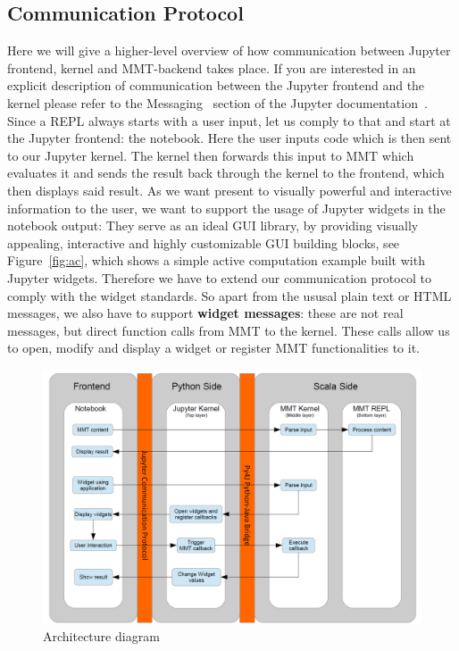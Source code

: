 \subsection{Communication Protocol}
Here we will give a higher-level overview of how communication between Jupyter frontend, kernel and MMT-backend takes place.
If you are interested in an explicit description of communication between the Jupyter frontend and the kernel please refer to the Messaging~\cite{Jupyter messaging} section of the Jupyter documentation~\cite{Jupyter documentation}.
Since a REPL always starts with a user input, let us comply to that and start at the Jupyter frontend: the notebook.
Here the user inputs code which is then sent to our Jupyter kernel.
The kernel then forwards this input to MMT which evaluates it and sends the result back through the kernel to the frontend, which then displays said result.
As we want present to visually powerful and interactive information to the user, we want to support the usage of Jupyter widgets in the notebook output:
They serve as an ideal GUI library, by providing visually appealing, interactive and highly customizable GUI building blocks, see Figure~\ref{fig:ac}, which shows a simple active computation example built with Jupyter widgets.
Therefore we have to extend our communication protocol to comply with the widget standards. So apart from the ususal plain text or HTML messages, we also have to support \textbf{widget messages}: these are not real messages, but direct function calls from MMT to the kernel. These calls allow us to open, modify and display a widget or register MMT functionalities to it.
\begin{figure}[ht]\centering
  \includegraphics[width=12cm]{ArchitectureDiagram}
  \caption{Architecture diagram}\label{fig:architecture-diagram}
\end{figure}

